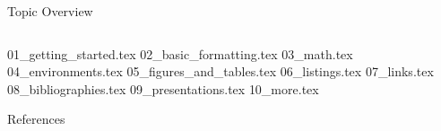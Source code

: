 



\begin{frame}[plain]{Topic Overview}
\begin{columns}[c,onlytextwidth]
\tableofcontents[sections={1-5}]
\tableofcontents[sections={6-10}]
\end{columns}
\end{frame}

{01_getting_started.tex}
{02_basic_formatting.tex}
{03_math.tex}
{04_environments.tex}
{05_figures_and_tables.tex}
{06_listings.tex}
{07_links.tex}
{08_bibliographies.tex}
{09_presentations.tex}
{10_more.tex}

\appendix
\beginbackup

\begin{frame}[allowframebreaks]{References}
\printbibliography
\end{frame}

\backupend


